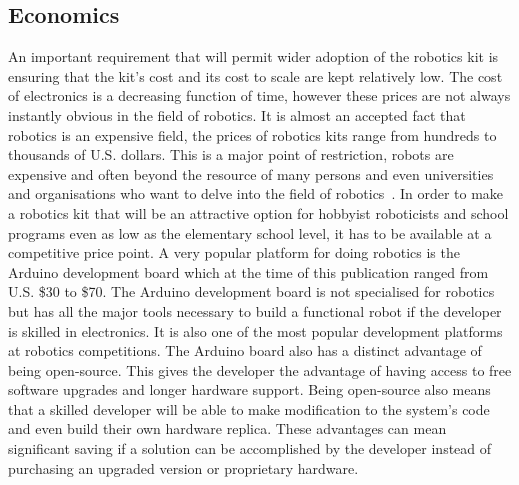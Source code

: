 \subsection{Economics} %
An important requirement that will permit wider adoption of the robotics kit is ensuring that the kit's cost and its cost to scale are kept relatively low. The cost of electronics is a decreasing function of time, however these prices are not always instantly obvious in the field of robotics. It is almost an accepted fact that robotics is an expensive field, the prices of robotics kits range from hundreds to thousands of U.S. dollars. This is a major point of restriction, robots are expensive and often beyond the resource of many persons and even universities and organisations who want to delve into the field of robotics~\parencite{vr}. In order to make a robotics kit that will be an attractive option for hobbyist roboticists and school programs even as low as the elementary school level, it has to be available at a competitive price point. A very popular platform for doing robotics is the Arduino development board which at the time of this publication ranged from U.S. \$30 to \$70. The Arduino development board is not specialised for robotics but has all the major tools necessary to build a functional robot if the developer is skilled in electronics. It is also one of the most popular development platforms at robotics competitions.
The Arduino board also has a distinct advantage of being open-source. This gives the developer the advantage of having access to free software upgrades and longer hardware support. Being open-source also means that a skilled developer will be able to make modification to the system's code and even build their own hardware replica. These advantages can mean significant saving if a solution can be accomplished by the developer instead of purchasing an upgraded version or proprietary hardware.

\label{sub:economics}


